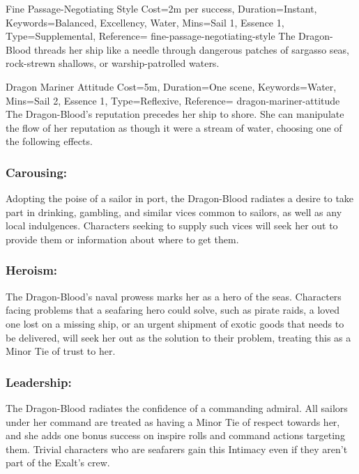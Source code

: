 
\begin{Charm}{Fine Passage-Negotiating Style}{%
    Cost=2m per success,
    Duration=Instant,
    Keywords={Balanced, Excellency, Water},
    Mins={Sail 1, Essence 1},
    Type=Supplemental,
    Reference=\cite*[p.~257]{db}
}{fine-passage-negotiating-style}
    The Dragon-Blood threads her ship like a needle through dangerous patches of
    sargasso seas, rock-strewn shallows, or warship-patrolled waters. 
\end{Charm}


\DocumentColumnBreak
\begin{Charm}{Dragon Mariner Attitude}{%
    Cost=5m,
    Duration=One scene,
    Keywords=Water,
    Mins={Sail 2, Essence 1},
    Type=Reflexive,
    Reference=\cite*[p.~257]{db}
}{dragon-mariner-attitude}
    The Dragon-Blood's reputation precedes her ship to shore. She can manipulate
    the flow of her reputation as though it were a stream of water, choosing one
    of the following effects.

    \subsubsection{Carousing:}
    Adopting the poise of a sailor in port, the Dragon-Blood radiates a desire to
    take part in drinking, gambling, and similar vices common to sailors, as well
    as any local indulgences. Characters seeking to supply such vices will seek her
    out to provide them or information about where to get them.

    \subsubsection{Heroism:}
    The Dragon-Blood's naval prowess marks her as a hero of the seas. Characters
    facing problems that a seafaring hero could solve, such as pirate raids, a
    loved one lost on a missing ship, or an urgent shipment of exotic goods that
    needs to be delivered, will seek her out as the solution to their problem,
    treating this as a Minor Tie of trust to her.

    \subsubsection{Leadership:}
    The Dragon-Blood radiates the confidence of a commanding admiral. All sailors
    under her command are treated as having a Minor Tie of respect towards her, and
    she adds one bonus success on inspire rolls and command actions targeting them.
    Trivial characters who are seafarers gain this Intimacy even if they aren't
    part of the Exalt's crew.


\end{Charm}

